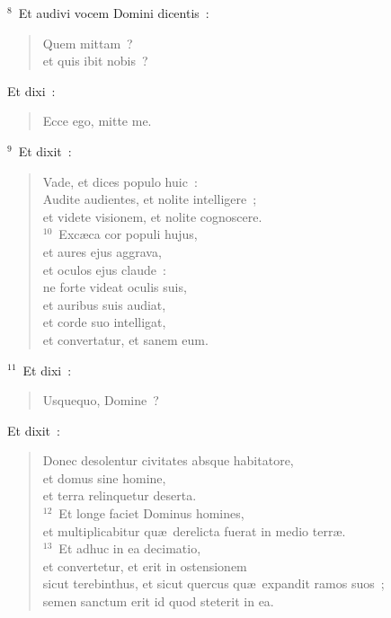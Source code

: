 ${}^{8}$~Et audivi vocem Domini dicentis~: \begin{verse}Quem mittam~?\\ et quis ibit nobis~?\end{verse}

 Et dixi~: \begin{verse}Ecce ego, mitte me.\end{verse}


${}^{9}$~Et dixit~: \begin{verse}Vade, et dices populo huic~:\\ Audite audientes, et nolite intelligere~;\\ et videte visionem, et nolite cognoscere.\\
${}^{10}$~Exc\ae ca cor populi hujus,\\ et aures ejus aggrava,\\ et oculos ejus claude~:\\ ne forte videat oculis suis,\\ et auribus suis audiat,\\ et corde suo intelligat,\\ et convertatur, et sanem eum.\end{verse}


${}^{11}$~Et dixi~: \begin{verse}Usquequo, Domine~?\end{verse}

 Et dixit~: \begin{verse}Donec desolentur civitates absque habitatore,\\ et domus sine homine,\\ et terra relinquetur deserta.\\
${}^{12}$~Et longe faciet Dominus homines,\\ et multiplicabitur qu\ae\ derelicta fuerat in medio terr\ae .\\
${}^{13}$~Et adhuc in ea decimatio,\\ et convertetur, et erit in ostensionem\\ sicut terebinthus, et sicut quercus qu\ae\ expandit ramos suos~;\\ semen sanctum erit id quod steterit in ea.\end{verse}




